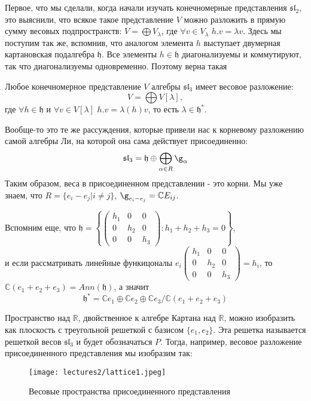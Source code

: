 \documentclass[a4article]{article}
\begin{document}
Первое, что мы сделали, когда начали изучать конечномерные представления $\mathfrak{sl}_2$, это выяснили, что всякое такое представление $V$ можно разложить в прямую сумму весовых подпространств: $V = \bigoplus V_{\lambda}$, где $\forall v \in V_{\lambda}$ $h.v = \lambda v$. Здесь мы поступим так же, вспомнив, что аналогом элемента $h$ выступает двумерная картановская подалгебра $\mathfrak{h}$. Все элементы $h \in \mathfrak{h}$ диагонализуемы и коммутируют, так что диагонализуемы одновременно. Поэтому верна такая
\begin{lemma}
    Любое конечномерное представление $V$ алгебры $\mathfrak{sl}_3$ имеет весовое разложение:
    \begin{equation}
        V = \bigoplus V[\lambda],
    \end{equation}
    где $\forall h \in \mathfrak{h}$ и $\forall v \in V[\lambda]$ $h.v = \lambda(h)v$, то есть $\lambda \in \mathfrak{h}^*$.
\end{lemma}
Вообще-то это те же рассуждения,
которые привели нас к корневому разложению самой алгебры Ли, на которой она сама действует присоединенно:
\begin{equation}
    \mathfrak{sl}_3 = \mathfrak{h}\oplus \bigoplus_{\alpha \in R} \g_{\alpha}
\end{equation}
Таким образом, веса в присоединенном представлении - это корни. Мы уже знаем, что 
$R = \{e_i - e_j| i \ne j\}$, $\g_{e_i - e_j} = \mathbb{C}E_{ij}$.

Вспомним еще, что $\mathfrak{h}=\left\{\left(\begin{array}{ccc}
h_1 & 0 & 0 \\
0 & h_2 & 0 \\
0 & 0 & h_3
\end{array}\right): h_1+h_2+h_3=0\right\}$,\\ и если рассматривать линейные функицоналы $e_i\left(\begin{array}{ccc}
h_1 & 0 & 0 \\
0 & h_2 & 0 \\
0 & 0 & h_3
\end{array}\right)=h_i$, то $\mathbb{C}(e_1+e_2+e_3) = Ann(\mathfrak{h})$, а значит 
\begin{equation}
    \mathfrak{h}^* = \mathbb{C}e_1\oplus \mathbb{C}e_2 \oplus \mathbb{C}e_3/\mathbb{C}(e_1+e_2+e_3)
\end{equation}

Пространство над $\mathbb{R}$, двойственное к алгебре Картана над $\mathbb{R}$, можно изобразить как плоскость с треугольной решеткой с базисом $\{e_1, e_2\}$. Эта решетка называется решеткой весов $\mathfrak{sl}_3$ и будет обозначаться $P$. Тогда, например, весовое разложение присоединенного представления мы изобразим так:
\begin{figure}[h]
    \centering
    \texttt{[image: lectures2/lattice1.jpeg]}
    \caption{Весовые пространства присоединенного представления}
    \label{fig:enter-label}
\end{figure}
\end{document}
